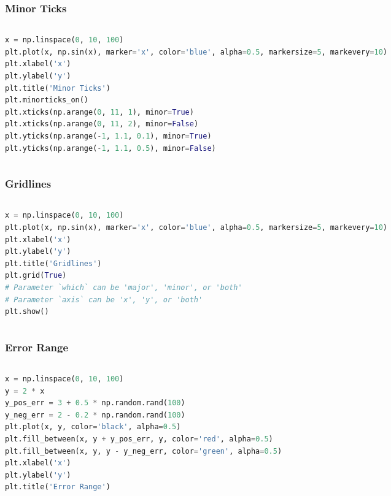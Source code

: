 \documentclass[beamer, en, version=2.0]{huangfusl-template}
\begin{document}
    \begin{frame}[fragile]
        \frametitle{Minor Ticks}

        \begin{columns}
        \begin{column}{0.5\textwidth}
\begin{lstlisting}[language=python, breaklines]
x = np.linspace(0, 10, 100)
plt.plot(x, np.sin(x), marker='x', color='blue', alpha=0.5, markersize=5, markevery=10)
plt.xlabel('x')
plt.ylabel('y')
plt.title('Minor Ticks')
plt.minorticks_on()
plt.xticks(np.arange(0, 11, 1), minor=True)
plt.xticks(np.arange(0, 11, 2), minor=False)
plt.yticks(np.arange(-1, 1.1, 0.1), minor=True)
plt.yticks(np.arange(-1, 1.1, 0.5), minor=False)
\end{lstlisting}
        \end{column}
        \begin{column}{0.5\textwidth}
            
        \end{column}
        \end{columns}
    \end{frame}
    \begin{frame}[fragile]
        \frametitle{Gridlines}

        \begin{columns}
        \begin{column}{0.5\textwidth}
\begin{lstlisting}[language=python, breaklines]
x = np.linspace(0, 10, 100)
plt.plot(x, np.sin(x), marker='x', color='blue', alpha=0.5, markersize=5, markevery=10)
plt.xlabel('x')
plt.ylabel('y')
plt.title('Gridlines')
plt.grid(True)
# Parameter `which` can be 'major', 'minor', or 'both'
# Parameter `axis` can be 'x', 'y', or 'both'
plt.show()
\end{lstlisting}
        \end{column}
        \begin{column}{0.5\textwidth}
            
        \end{column}
        \end{columns}
    \end{frame}
    \begin{frame}[fragile]
        \frametitle{Error Range}

        \begin{columns}
        \begin{column}{0.5\textwidth}
\begin{lstlisting}[language=python, breaklines]
x = np.linspace(0, 10, 100)
y = 2 * x
y_pos_err = 3 + 0.5 * np.random.rand(100)
y_neg_err = 2 - 0.2 * np.random.rand(100)
plt.plot(x, y, color='black', alpha=0.5)
plt.fill_between(x, y + y_pos_err, y, color='red', alpha=0.5)
plt.fill_between(x, y, y - y_neg_err, color='green', alpha=0.5)
plt.xlabel('x')
plt.ylabel('y')
plt.title('Error Range')
\end{lstlisting}
        \end{column}
        \begin{column}{0.5\textwidth}
            
        \end{column}
        \end{columns}
    \end{frame}
\end{document}

